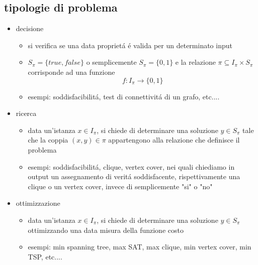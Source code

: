\subsection*{tipologie di problema}
\begin{itemize}
	\item decisione
		\begin{itemize}
			\item si verifica se una data propriet\'a \'e valida per un determinato input
			\item $S_{\pi}=\{true,false\}$ o semplicemente $S_{\pi}=\{0,1\}$ e la relazione $\pi\subseteq I_{\pi}\times S_{\pi}$ corrisponde ad una funzione $$f:I_{\pi}\rightarrow\{0,1\}$$ 
			\item esempi: soddisfacibilit\'a, test di connettivit\'a di un grafo, etc....
		\end{itemize}
	\item ricerca
	\begin{itemize}
		\item data un'istanza $x\in I_{\pi}$, si chiede di determinare una soluzione $y\in S_{\pi}$ tale che la coppia $(x,y)\in\pi$ appartengono alla relazione che definisce il problema
		\item esempi: soddisfacibilit\'a, clique, vertex cover, nei quali chiediamo in output un assegnamento di verit\'a soddisfacente, rispettivamente una clique o un vertex cover, invece di semplicemente "si" o "no"
	\end{itemize}
	\item ottimizzazione
	\begin{itemize}
		\item data un'istanza $x\in I_{\pi}$, si chiede di determinare una soluzione $y\in S_{\pi}$ ottimizzando una data misura della funzione costo
		\item esempi: min spanning tree, max SAT, max clique, min vertex cover, min TSP, etc....
	\end{itemize}
\end{itemize}


